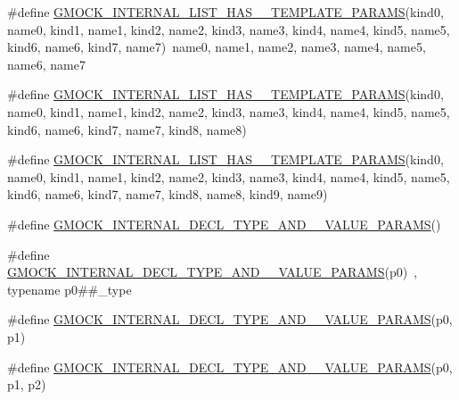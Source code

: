 \begin{DoxyCompactItemize}
\#define \mbox{\hyperlink{_obj__test_2lib_2googletest-master_2googlemock_2include_2gmock_2gmock-generated-actions_8h_a1080c34f9f1d183b54b4b710b5a6e98d}{G\+M\+O\+C\+K\+\_\+\+I\+N\+T\+E\+R\+N\+A\+L\+\_\+\+L\+I\+S\+T\+\_\+\+H\+A\+S\+\_\+\_\+\+T\+E\+M\+P\+L\+A\+T\+E\+\_\+\+P\+A\+R\+A\+MS}}(kind0,  name0,  kind1,  name1,  kind2,  name2,  kind3,  name3,  kind4,  name4,  kind5,  name5,  kind6,  name6,  kind7,  name7)~name0, name1, name2, name3, name4, name5, name6, name7
\item 
\#define \mbox{\hyperlink{_obj__test_2lib_2googletest-master_2googlemock_2include_2gmock_2gmock-generated-actions_8h_a2492e9cf6abea9975cc7703e24fb4409}{G\+M\+O\+C\+K\+\_\+\+I\+N\+T\+E\+R\+N\+A\+L\+\_\+\+L\+I\+S\+T\+\_\+\+H\+A\+S\+\_\+\_\+\+T\+E\+M\+P\+L\+A\+T\+E\+\_\+\+P\+A\+R\+A\+MS}}(kind0,  name0,  kind1,  name1,  kind2,  name2,  kind3,  name3,  kind4,  name4,  kind5,  name5,  kind6,  name6,  kind7,  name7,  kind8,  name8)
\item 
\#define \mbox{\hyperlink{_obj__test_2lib_2googletest-master_2googlemock_2include_2gmock_2gmock-generated-actions_8h_ab216ed7cf202e5c97e4a4e4115c416d2}{G\+M\+O\+C\+K\+\_\+\+I\+N\+T\+E\+R\+N\+A\+L\+\_\+\+L\+I\+S\+T\+\_\+\+H\+A\+S\+\_\+\_\+\+T\+E\+M\+P\+L\+A\+T\+E\+\_\+\+P\+A\+R\+A\+MS}}(kind0,  name0,  kind1,  name1,  kind2,  name2,  kind3,  name3,  kind4,  name4,  kind5,  name5,  kind6,  name6,  kind7,  name7,  kind8,  name8,  kind9,  name9)
\item 
\#define \mbox{\hyperlink{_obj__test_2lib_2googletest-master_2googlemock_2include_2gmock_2gmock-generated-actions_8h_a9eda3221eac423c7026d63fc486d1296}{G\+M\+O\+C\+K\+\_\+\+I\+N\+T\+E\+R\+N\+A\+L\+\_\+\+D\+E\+C\+L\+\_\+\+T\+Y\+P\+E\+\_\+\+A\+N\+D\+\_\+\_\+\+V\+A\+L\+U\+E\+\_\+\+P\+A\+R\+A\+MS}}()
\item 
\#define \mbox{\hyperlink{_obj__test_2lib_2googletest-master_2googlemock_2include_2gmock_2gmock-generated-actions_8h_a462396713d8024e37a66fb12abd87a00}{G\+M\+O\+C\+K\+\_\+\+I\+N\+T\+E\+R\+N\+A\+L\+\_\+\+D\+E\+C\+L\+\_\+\+T\+Y\+P\+E\+\_\+\+A\+N\+D\+\_\+\_\+\+V\+A\+L\+U\+E\+\_\+\+P\+A\+R\+A\+MS}}(p0)~, typename p0\#\#\+\_\+type
\item 
\#define \mbox{\hyperlink{_obj__test_2lib_2googletest-master_2googlemock_2include_2gmock_2gmock-generated-actions_8h_a8de8a9ba55313f4f4ba936c28ffe0d93}{G\+M\+O\+C\+K\+\_\+\+I\+N\+T\+E\+R\+N\+A\+L\+\_\+\+D\+E\+C\+L\+\_\+\+T\+Y\+P\+E\+\_\+\+A\+N\+D\+\_\+\_\+\+V\+A\+L\+U\+E\+\_\+\+P\+A\+R\+A\+MS}}(p0,  p1)
\item 
\#define \mbox{\hyperlink{_obj__test_2lib_2googletest-master_2googlemock_2include_2gmock_2gmock-generated-actions_8h_a2def1ab63696280e9b8c20ed176d0c92}{G\+M\+O\+C\+K\+\_\+\+I\+N\+T\+E\+R\+N\+A\+L\+\_\+\+D\+E\+C\+L\+\_\+\+T\+Y\+P\+E\+\_\+\+A\+N\+D\+\_\+\_\+\+V\+A\+L\+U\+E\+\_\+\+P\+A\+R\+A\+MS}}(p0,  p1,  p2)

\end{DoxyCompactItemize}
